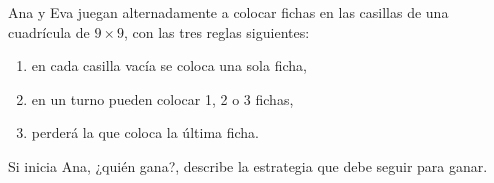 Ana y Eva juegan alternadamente a colocar fichas en las casillas de una cuadrícula de $9 \times  9$, con las tres reglas siguientes:
 \begin{enumerate} 
 \item  en cada casilla vacía se coloca una sola ficha,
 \item  en un turno pueden colocar 1, 2 o 3 fichas,
 \item  perderá la que coloca la última ficha.
 \end{enumerate} 
Si inicia Ana, ¿quién gana?, describe la estrategia que debe seguir para ganar.